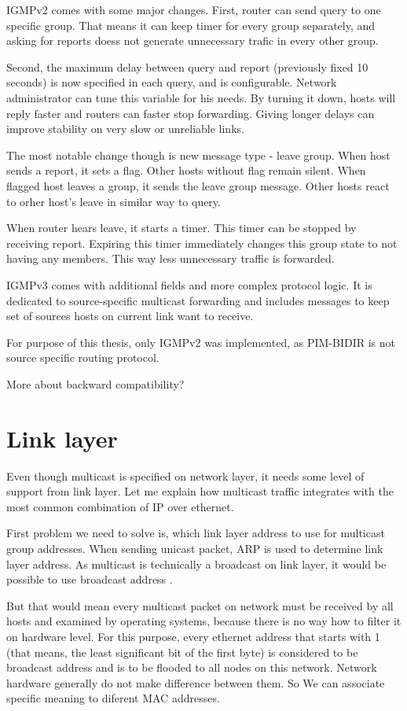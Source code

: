 IGMPv2 \cite{rfc2236} comes with some major changes. First, router can send query to one
specific group. That means it can keep timer for every group separately, and
asking for reports doess not generate unnecessary trafic in every other group.

Second, the maximum delay between query and report (previously fixed 10
seconds) is now specified in each query, and is configurable. Network
administrator can tune this variable for his needs. By turning it down, hosts
will reply faster and routers can faster stop forwarding. Giving longer delays
can improve stability on very slow or unreliable links.

The most notable change though is new message type - leave group. When host
sends a report, it sets a flag. Other hosts without flag remain silent. When
flagged host leaves a group, it sends the leave group message. Other hosts
react to orher host's leave in similar way to query.

When router hears leave, it starts a timer. This timer can be stopped by
receiving report. Expiring this timer immediately changes this group state to
not having any members. This way less unnecessary traffic is forwarded.

IGMPv3 comes with additional fields and more complex protocol logic. It is
dedicated to source-specific multicast forwarding and includes messages to keep
set of sources hosts on current link want to receive.

For purpose of this thesis, only IGMPv2 was implemented, as PIM-BIDIR is not
source specific routing protocol.

\TODO More about backward compatibility?

\section{Link layer}

Even though multicast is specified on network layer, it needs some level of
support from link layer. Let me explain how multicast traffic integrates with
the most common combination of IP over ethernet.

First problem we need to solve is, which link layer address to use for
multicast group addresses. When sending unicast packet, ARP is used to
determine link layer address. As multicast is technically a broadcast on link
layer, it would be possible to use broadcast address .

But that would mean every multicast packet on network must be received by all
hosts and examined by operating systems, because there is no way how to filter
it on hardware level. For this purpose, every ethernet address that starts with
1 (that means, the least significant bit of the first byte) is considered to be
broadcast address and is to be flooded to all nodes on this network. Network
hardware generally do not make difference between them. So We can associate
specific meaning to diferent MAC addresses.

